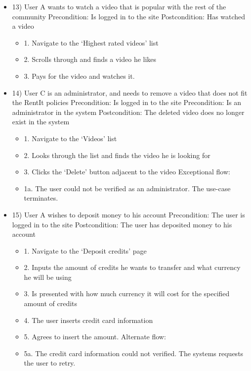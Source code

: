 \begin{itemize}
\item 13) 
User A wants to watch a video that is popular with the rest of the community
\newline Precondition: Is logged in to the site
\newline Postcondition: Has watched a video
\begin{itemize}
    \item 1. Navigate to the ‘Highest rated videos’ list
    \item 2. Scrolls through and finds a video he likes
    \item 3. Pays for the video and watches it.
\end{itemize}

\item 14)
User C is an administrator, and needs to remove a video that does not fit the RentIt policies
\newline Precondition: Is logged in to the site
\newline Precondition: Is an administrator in the system
\newline Postcondition: The deleted video does no longer exist in the system
\begin{itemize}
    \item 1. Navigate to the ‘Videos’ list
    \item 2. Looks through the list and finds the video he is looking for
    \item 3. Clicks the ‘Delete’ button adjacent to the video
\newline Exceptional flow:
    \item 1a. The user could not be verified as an administrator. The use-case terminates.
\end{itemize}

\item 15)
User A wishes to deposit money to his account
\newline Precondition: The user is logged in to the site
\newline Postcondition: The user has deposited money to his account
\begin{itemize}
    \item 1. Navigate to the ‘Deposit credits’ page
    \item 2. Inputs the amount of credits he wants to transfer and what currency he will be using
    \item 3. Is presented with how much currency it will cost for the specified amount of credits
    \item 4. The user inserts credit card information
    \item 5. Agrees to insert the amount.
\newline Alternate flow:
    \item 5a. The credit card information could not verified. The systems requests the user to retry.
\end{itemize}


\end{itemize}
